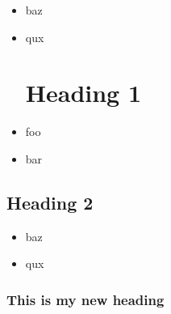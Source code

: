 \documentclass{article}
\begin{document}
\begin{itemize}
    \item baz
    \item qux
\section{Heading 1}
\end{itemize}

\begin{itemize}
    \item foo
    \item bar
\end{itemize}

\subsection{Heading 2}
\begin{itemize}
    \item baz
    \item qux
\end{itemize}

\subsubsection{This is my new heading}
\end{document}
